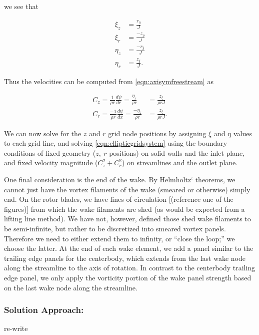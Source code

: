 \noindent we see that

\begin{align}
    \xi_z &= \frac{r_\eta}{J} \\
    \xi_r &= \frac{-z_\eta}{J} \\
    \eta_z &= \frac{-r_\xi}{J} \\
    \eta_r &= \frac{z_\xi}{J}.
\end{align}

\noindent Thus the velocities can be computed from \cref{eqn:axisymfreestream} as

\begin{align}
    C_z = \frac{1}{\rho r} \frac{d\psi}{dr} = \frac{\eta_r}{\rho r} &= \frac{z_\xi}{\rho r J} \\
    C_r = \frac{-1}{\rho r} \frac{d\psi}{dx} = \frac{-\eta_z}{\rho r} &= \frac{z_\xi}{\rho r J}.
\end{align}


We can now solve for the \(z\) and \(r\) grid node positions by assigning \(\xi\) and \(\eta\) values to each grid line, and solving \cref{eqn:ellipticgridsystem} using the boundary conditions of fixed geometry (\(z,~r\) positions) on solid walls and the inlet plane, and fixed velocity magnitude (\(C_z^2+C_r^2\)) on streamlines and the outlet plane.


One final consideration is the end of the wake.
%
By Helmholtz` theorems, we cannot just have the vortex filaments of the wake (smeared or otherwise) simply end.
%
On the rotor blades, we have lines of circulation [(reference one of the figures)] from which the wake filaments are shed (as would be expected from a lifting line method).
%
We have not, however, defined those shed wake filaments to be semi-infinite, but rather to be discretized into smeared vortex panels.
%
Therefore we need to either extend them to infinity, or ``close the loop;'' we choose the latter.
%
At the end of each wake element, we add a panel similar to the trailing edge panels for the centerbody, which extends from the last wake node along the streamline to the axis of rotation.
%
In contrast to the centerbody trailing edge panel, we only apply the vorticity portion of the wake panel strength based on the last wake node along the streamline.

\subsubsection{Solution Approach:}
re-write


